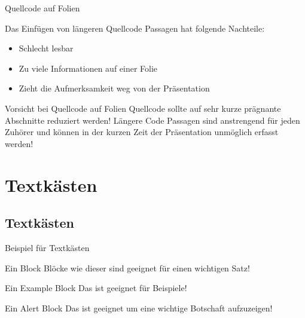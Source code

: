 \documentclass[mathserif,serif,german]{beamer}
\begin{document}
\begin{frame}[fragile]{Quellcode auf Folien}
	
	Das Einfügen von längeren Quellcode Passagen hat folgende Nachteile:
	\begin{itemize}
		\item Schlecht lesbar
		\item Zu viele Informationen auf einer Folie
		\item Zieht die Aufmerksamkeit weg von der Präsentation
		
	\end{itemize}
	
	
	\begin{alertblock}{Vorsicht bei Quellcode auf Folien}
		Quellcode sollte auf sehr kurze prägnante Abschnitte reduziert werden! Längere Code Passagen sind anstrengend für jeden Zuhörer und können in der kurzen Zeit der Präsentation unmöglich erfasst werden!
	\end{alertblock}
	
\end{frame}	



\section{Textkästen}
\subsection{Textkästen}


\begin{frame}{Beispiel für Textkästen}
	
	\begin{block}{Ein Block}
		Blöcke wie dieser sind geeignet für einen wichtigen Satz!
	\end{block}
	
	\begin{exampleblock}{Ein Example Block}
		Das ist geeignet für Beispiele!
	\end{exampleblock}
	
	\begin{alertblock}{Ein Alert Block}
		Das ist geeignet um eine wichtige Botschaft aufzuzeigen!
	\end{alertblock}
	
\end{frame}	
\end{document}
